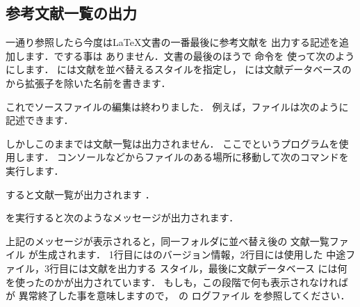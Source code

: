 \subsection{参考文献一覧の出力}
一通り参照したら今度は{\LaTeX}文書の一番最後に参考文献を
出力する記述を追加します．でする事は
ありません．文書の最後のほうで  命令を
使って次のようにします．%
% 
には文献を並べ替えるスタイルを指定し，
には文献データベースの
から拡張子を除いた名前を書きます．

これでソースファイルの編集は終わりました．
例えば，ファイルは次のように記述できます．
しかしこのままでは文献一覧は出力されません．
ここで{\JBibTeX}というプログラムを使用します．
コンソールなどからファイルのある場所に移動して次のコマンドを実行します．

すると文献一覧が出力されます%
．

\JBibTeX を実行すると次のようなメッセージが出力されます．


%
上記のメッセージが表示されると，同一フォルダに並べ替え後の
文献一覧ファイル が生成されます．
1行目には{\JBibTeX}のバージョン情報，2行目には使用した
中途ファイル，3行目には文献を出力する
スタイル，最後に文献データベース 
には何を使ったのかが出力されています．
もしも，この段階で何も表示されなければ\JBibTeX が
{異常終了した事を意味しますので}，\JBibTeX\ の
ログファイル を参照してください．

